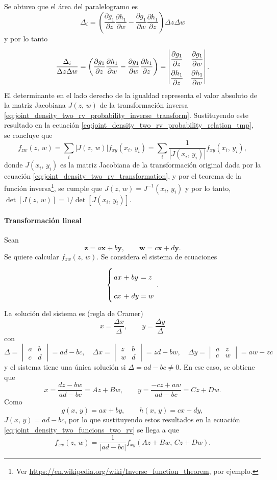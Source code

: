 \documentclass[a4paper]{report}
\newcommand{\x}{\mathbf{x}}
\newcommand{\y}{\mathbf{y}}
\newcommand{\w}{\mathbf{w}}
\newcommand{\z}{\mathbf{z}}
\begin{document}
Se obtuvo que el área del paralelogramo es
\[
 \Delta_i=\left(\frac{\partial g_1}{\partial z}\frac{\partial h_1}{\partial w}-\frac{\partial g_1}{\partial w}\frac{\partial h_1}{\partial z}\right)\Delta z\Delta w
\]
y por lo tanto
\[
 \frac{\Delta_i}{\Delta z\Delta w}=\left(\frac{\partial g_1}{\partial z}\frac{\partial h_1}{\partial w}-\frac{\partial g_1}{\partial w}\frac{\partial h_1}{\partial z}\right)
 =
 \def\arraystretch{2.2}
 \begin{vmatrix}
   \dfrac{\partial g_1}{\partial z} & \dfrac{\partial g_1}{\partial w} \\
   \dfrac{\partial h_1}{\partial z} & \dfrac{\partial h_1}{\partial w}
 \end{vmatrix}.
\]
El determinante en el lado derecho de la igualdad representa el valor absoluto de la matriz Jacobiana \(J(z,\,w)\) de la transformación inversa \ref{eq:joint_density_two_rv_probability_inverse_transform}. Sustituyendo este resultado en la ecuación \ref{eq:joint_density_two_rv_probability_relation_tmp}, se concluye que 
\[
 f_{zw}(z,\,w)=\sum_i|J(z,\,w)|f_{xy}(x_i,\,y_i)=\sum_i\frac{1}{|J(x_i,\,y_i)|}f_{xy}(x_i,\,y_i),
\]
donde \(J(x_i,\,y_i)\) es la matriz Jacobiana de la transformación original dada por la ecuación \ref{eq:joint_density_two_rv_transformation}, y por el teorema de la función inversa\footnote{Ver \url{https://en.wikipedia.org/wiki/Inverse_function_theorem}, por ejemplo.}, se cumple que \(J(z,\,w)=J^{-1}(x_i,\,y_i)\) y por lo tanto, \(\det[J(z,\,w)]=1/\det[J(x_i,\,y_i)]\).

\paragraph{Transformación lineal}
Sean
\[
 \z=a\x+b\y,\qquad \w=c\x+d\y.
\]
Se quiere calcular \(f_{zw}(z,\,w)\). Se considera el sistema de ecuaciones
\[
\arraycolsep=1.4pt
 \left\{
 \begin{array}{lllll}
  ax&+&by&=&z\\
  cx&+&dy&=&w
 \end{array} \right..
\]
La solución del sistema es (regla de Cramer)
\[
 x=\frac{\Delta x}{\Delta},\qquad y=\frac{\Delta y}{\Delta}
\]
con
\[
\Delta=
\begin{vmatrix}
  a & b \\
  c & d
\end{vmatrix}
=ad-bc,
\quad
\Delta x=
\begin{vmatrix}
  z & b \\
  w & d
\end{vmatrix}
=zd-bw,
\quad
\Delta y=
\begin{vmatrix}
  a & z \\
  c & w
\end{vmatrix}
=aw-zc
\]
y el sistema tiene una única solución si \(\Delta=ad-bc\neq0\). En ese caso, se obtiene que
\[
 x=\frac{dz-bw}{ad-bc}=Az+Bw,\qquad y=\frac{-cz+aw}{ad-bc}=Cz+Dw.
\]
Como
\[
 g(x,\,y)=ax+by,\qquad h(x,\,y)=cx+dy,
\]
\(J(x,\,y)=ad-bc\),
por lo que sustituyendo estos resultados en la ecuación \ref{eq:joint_density_two_funcions_two_rv} se llega a que
\begin{equation}\label{eq:two_rv_linear_transformation}
 f_{zw}(z,\,w)=\frac{1}{|ad-bc|}f_{xy}(Az+Bw,\,Cz+Dw).
\end{equation}
\end{document}
